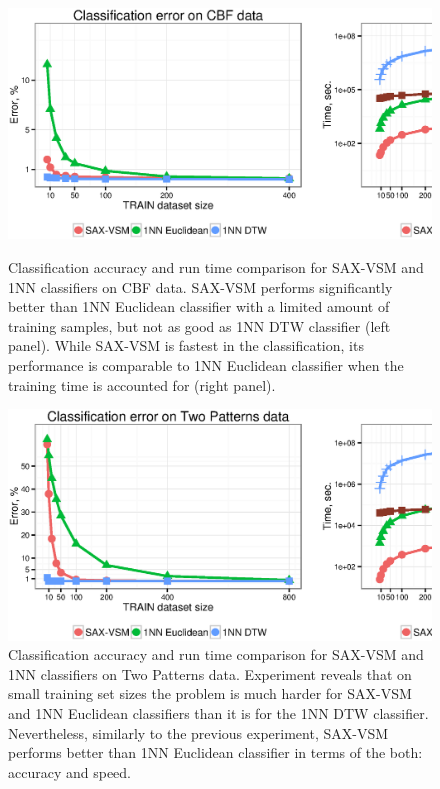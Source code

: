 \begin{figure}[t]
   \centering
   \includegraphics[width=140mm]{figures/cbf-precision-runtime.ps}
   \caption[Classification accuracy and run time comparison for SAX-VSM and 1NN classifiers on CBF data.]
   {Classification accuracy and run time comparison for SAX-VSM and 1NN classifiers on CBF data.
   SAX-VSM performs significantly better than 1NN Euclidean classifier with 
   a limited amount of training samples, but not as good as 1NN DTW classifier (left panel). 
   While SAX-VSM is fastest in the classification, its performance is comparable to 1NN Euclidean classifier 
   when the training time is accounted for (right panel).}
   \label{fig:precision-runtime}

   \includegraphics[width=140mm]{figures/2patterns-precision-runtime.ps}
   \caption[Classification accuracy and run time comparison for SAX-VSM and 1NN classifiers on Two Patterns data.]
   {Classification accuracy and run time comparison for SAX-VSM and 1NN classifiers on Two Patterns data.
   Experiment reveals that on small training set sizes the problem is much harder 
   for SAX-VSM and 1NN Euclidean classifiers than it is for the 1NN DTW classifier. 
   Nevertheless, similarly to the previous experiment, SAX-VSM performs better than 1NN Euclidean classifier
   in terms of the both: accuracy and speed.}
   \label{fig:2p-precision-runtime}
\end{figure}

